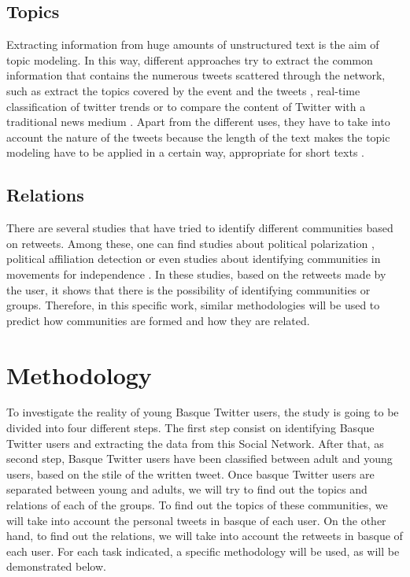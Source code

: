 \documentclass[information,article,submit,moreauthors,pdftex,10pt,a4paper]{Definitions/mdpi}
\begin{document}
\subsection{Topics}\label{sec:topics_background}

Extracting information from huge amounts of unstructured text is the aim of topic modeling. In this way, different approaches try to extract the common information that contains the numerous tweets scattered through the network, such as extract the topics covered by the event and the tweets \citep{hu2012lda}, real-time classification of twitter trends \citep{zubiaga2015real} or to compare the content of Twitter with a traditional news medium \citep{zhao2011comparing}. Apart from the different uses, they have to take into account the nature of the tweets because the length of the text makes the topic modeling have to be applied in a certain way, appropriate for short texts \citep{hong2010empirical}.

\subsection{Relations}\label{sec:connections_background}

There are several studies that have tried to identify different communities based on retweets. Among these, one can find studies about political polarization \citep{conover2011political}, political affiliation detection \citep{pennacchiotti2011democrats} or even studies about identifying communities in movements for independence \citep{zubiaga2017stance}. In these studies, based on the retweets made by the user, it shows that there is the possibility of identifying communities or groups. Therefore, in this specific work, similar methodologies will be used to predict how communities are formed and how they are related.


\section{Methodology}\label{sec:methodology}

To investigate the reality of young Basque Twitter users, the study is going to be divided into four different steps. The first step consist on identifying Basque Twitter users and extracting the data from this Social Network. After that, as second step, Basque Twitter users have been classified between adult and young users, based on the stile of the written tweet. Once basque Twitter users are separated between young and adults, we will try to find out the topics and relations of each of the groups. To find out the topics of these communities, we will take into account the personal tweets in basque of each user. On the other hand, to find out the relations, we will take into account the retweets in basque of each user. For each task indicated, a specific methodology will be used, as will be demonstrated below.
\end{document}
